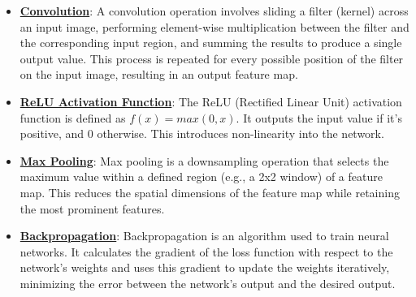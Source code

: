\documentclass{article}%
\begin{document}
\begin{itemize}[leftmargin=*]%
\item \href{https://purdue.brightspace.com/d2l/common/assets/pdfjs-d2l-dist/1.0.14-legacy/web/viewer.html?file=\%2Fcontent\%2Fenforced\%2F1095467-wl.202510.CS.24300.001\%2F09L1-cnn.pdf\%3Fou\%3D1095467\&lang=en-us\&container=d2l-fileviewer-rendered-pdf\&fullscreen=d2l-fileviewer-rendered-pdf-dialog\&height=667#page=6}{\textbf{Convolution}}: A convolution operation involves sliding a filter (kernel) across an input image, performing element-wise multiplication between the filter and the corresponding input region, and summing the results to produce a single output value. This process is repeated for every possible position of the filter on the input image, resulting in an output feature map.%
\item \href{https://purdue.brightspace.com/d2l/common/assets/pdfjs-d2l-dist/1.0.14-legacy/web/viewer.html?file=\%2Fcontent\%2Fenforced\%2F1095467-wl.202510.CS.24300.001\%2F09L1-cnn.pdf\%3Fou\%3D1095467\&lang=en-us\&container=d2l-fileviewer-rendered-pdf\&fullscreen=d2l-fileviewer-rendered-pdf-dialog\&height=667#page=13}{\textbf{ReLU Activation Function}}: The ReLU (Rectified Linear Unit) activation function is defined as $f(x) = max(0, x)$. It outputs the input value if it's positive, and 0 otherwise. This introduces non-linearity into the network.%
\item \href{https://purdue.brightspace.com/d2l/common/assets/pdfjs-d2l-dist/1.0.14-legacy/web/viewer.html?file=\%2Fcontent\%2Fenforced\%2F1095467-wl.202510.CS.24300.001\%2F09L1-cnn.pdf\%3Fou\%3D1095467\&lang=en-us\&container=d2l-fileviewer-rendered-pdf\&fullscreen=d2l-fileviewer-rendered-pdf-dialog\&height=667#page=14}{\textbf{Max Pooling}}: Max pooling is a downsampling operation that selects the maximum value within a defined region (e.g., a 2x2 window) of a feature map. This reduces the spatial dimensions of the feature map while retaining the most prominent features.%
\item \href{https://purdue.brightspace.com/d2l/common/assets/pdfjs-d2l-dist/1.0.14-legacy/web/viewer.html?file=\%2Fcontent\%2Fenforced\%2F1095467-wl.202510.CS.24300.001\%2F09L1-cnn.pdf\%3Fou\%3D1095467\&lang=en-us\&container=d2l-fileviewer-rendered-pdf\&fullscreen=d2l-fileviewer-rendered-pdf-dialog\&height=667#page=16}{\textbf{Backpropagation}}: Backpropagation is an algorithm used to train neural networks. It calculates the gradient of the loss function with respect to the network's weights and uses this gradient to update the weights iteratively, minimizing the error between the network's output and the desired output.%
\end{itemize}%
\end{document}
